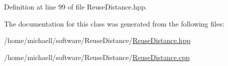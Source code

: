 Definition at line 99 of file ReuseDistance.hpp.



The documentation for this class was generated from the following files:\begin{DoxyCompactItemize}
\item 
/home/michaell/software/ReuseDistance/\hyperlink{_reuse_distance_8hpp}{ReuseDistance.hpp}\item 
/home/michaell/software/ReuseDistance/\hyperlink{_reuse_distance_8cpp}{ReuseDistance.cpp}\end{DoxyCompactItemize}
